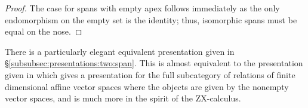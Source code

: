 \begin{proof}
The case for spans with empty apex follows immediately as the only endomorphism on the empty set is the identity; thus,  isomorphic spans must be equal on the nose.

\end{proof}

There is a particularly elegant equivalent presentation given in \S \ref{subsubsec:presentations:two:span}.
This is almost equivalent to the presentation given in \cite{affine} which gives a presentation for the full subcategory of relations of finite dimensional affine vector spaces where the objects are given by the nonempty vector spaces, and is much more in the spirit of the ZX-calculus.


